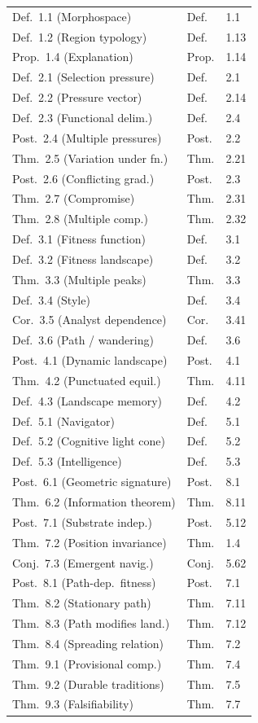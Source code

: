 \documentclass[10pt]{article}
\theoremstyle{definition}
\theoremstyle{plain}
\theoremstyle{remark}
\begin{document}
{\begin{longtable}{@{}p{50mm}lp{18mm}@{}}
Def.~1.1 (Morphospace) & Def. & 1.1 \\
Def.~1.2 (Region typology) & Def. & 1.13 \\
Prop.~1.4 (Explanation) & Prop. & 1.14 \\
\addlinespace
Def.~2.1 (Selection pressure) & Def. & 2.1 \\
Def.~2.2 (Pressure vector) & Def. & 2.14 \\
Def.~2.3 (Functional delim.) & Def. & 2.4 \\
Post.~2.4 (Multiple pressures) & Post. & 2.2 \\
Thm.~2.5 (Variation under fn.) & Thm. & 2.21 \\
Post.~2.6 (Conflicting grad.) & Post. & 2.3 \\
Thm.~2.7 (Compromise) & Thm. & 2.31 \\
Thm.~2.8 (Multiple comp.) & Thm. & 2.32 \\
\addlinespace
Def.~3.1 (Fitness function) & Def. & 3.1 \\
Def.~3.2 (Fitness landscape) & Def. & 3.2 \\
Thm.~3.3 (Multiple peaks) & Thm. & 3.3 \\
Def.~3.4 (Style) & Def. & 3.4 \\
Cor.~3.5 (Analyst dependence) & Cor. & 3.41 \\
Def.~3.6 (Path / wandering) & Def. & 3.6 \\
\addlinespace
Post.~4.1 (Dynamic landscape) & Post. & 4.1 \\
Thm.~4.2 (Punctuated equil.) & Thm. & 4.11 \\
Def.~4.3 (Landscape memory) & Def. & 4.2 \\
\addlinespace
Def.~5.1 (Navigator) & Def. & 5.1 \\
Def.~5.2 (Cognitive light cone) & Def. & 5.2 \\
Def.~5.3 (Intelligence) & Def. & 5.3 \\
\addlinespace
Post.~6.1 (Geometric signature) & Post. & 8.1 \\
Thm.~6.2 (Information theorem) & Thm. & 8.11 \\
\addlinespace
Post.~7.1 (Substrate indep.) & Post. & 5.12 \\
Thm.~7.2 (Position invariance) & Thm. & 1.4 \\
Conj.~7.3 (Emergent navig.) & Conj. & 5.62 \\
\addlinespace
Post.~8.1 (Path-dep.\ fitness) & Post. & 7.1 \\
Thm.~8.2 (Stationary path) & Thm. & 7.11 \\
Thm.~8.3 (Path modifies land.) & Thm. & 7.12 \\
Thm.~8.4 (Spreading relation) & Thm. & 7.2 \\
\addlinespace
Thm.~9.1 (Provisional comp.) & Thm. & 7.4 \\
Thm.~9.2 (Durable traditions) & Thm. & 7.5 \\
Thm.~9.3 (Falsifiability) & Thm. & 7.7 \\
\end{longtable}
}
\end{document}
